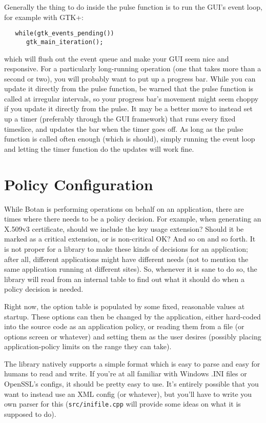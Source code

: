 \documentclass{article}
\newcommand{\filename}[1]{\texttt{#1}}
\begin{document}
Generally the thing to do inside the pulse function is to run the GUI's event
loop, for example with GTK+:

\begin{verbatim}
   while(gtk_events_pending())
      gtk_main_iteration();
\end{verbatim}

which will flush out the event queue and make your GUI seem nice and
responsive. For a particularly long-running operation (one that takes more than
a second or two), you will probably want to put up a progress bar. While you
can update it directly from the pulse function, be warned that the pulse
function is called at irregular intervals, so your progress bar's movement
might seem choppy if you update it directly from the pulse. It may be a better
move to instead set up a timer (preferably through the GUI framework) that runs
every fixed timeslice, and updates the bar when the timer goes off. As long as
the pulse function is called often enough (which is should), simply running the
event loop and letting the timer function do the updates will work fine.

\pagebreak

\section{Policy Configuration}

While Botan is performing operations on behalf on an application, there are
times where there needs to be a policy decision. For example, when generating
an X.509v3 certificate, should we include the key usage extension? Should it be
marked as a critical extension, or is non-critical OK? And so on and so
forth. It is not proper for a library to make these kinds of decisions for an
application; after all, different applications might have different needs (not
to mention the same application running at different sites). So, whenever it is
sane to do so, the library will read from an internal table to find out what it
should do when a policy decision is needed.

Right now, the option table is populated by some fixed, reasonable values at
startup. These options can then be changed by the application, either
hard-coded into the source code as an application policy, or reading them from
a file (or options screen or whatever) and setting them as the user desires
(possibly placing application-policy limits on the range they can take).

The library natively supports a simple format which is easy to parse and easy
for humans to read and write. If you're at all familiar with Windows .INI files
or OpenSSL's configs, it should be pretty easy to use. It's entirely possible
that you want to instead use an XML config (or whatever), but you'll have to
write you own parser for this (\filename{src/inifile.cpp} will provide some
ideas on what it is supposed to do).
\end{document}
